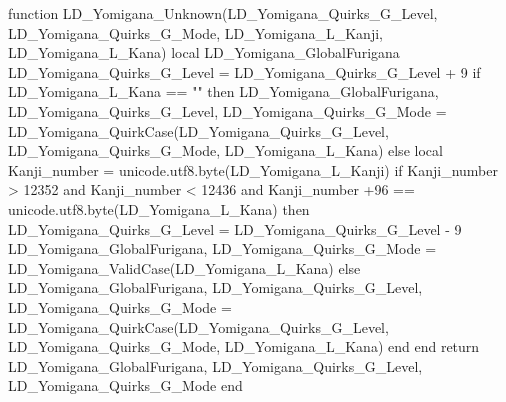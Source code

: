 {	function LD_Yomigana_Unknown(LD_Yomigana_Quirks_G_Level, LD_Yomigana_Quirks_G_Mode, LD_Yomigana_L_Kanji, LD_Yomigana_L_Kana)
		local LD_Yomigana_GlobalFurigana
		LD_Yomigana_Quirks_G_Level = LD_Yomigana_Quirks_G_Level + 9
		if LD_Yomigana_L_Kana == "" then
			LD_Yomigana_GlobalFurigana, LD_Yomigana_Quirks_G_Level, LD_Yomigana_Quirks_G_Mode = LD_Yomigana_QuirkCase(LD_Yomigana_Quirks_G_Level, LD_Yomigana_Quirks_G_Mode, LD_Yomigana_L_Kana) 		
		else
			local Kanji_number = unicode.utf8.byte(LD_Yomigana_L_Kanji)
			if Kanji_number > 12352 and Kanji_number < 12436 and Kanji_number +96 == unicode.utf8.byte(LD_Yomigana_L_Kana) then 
				LD_Yomigana_Quirks_G_Level = LD_Yomigana_Quirks_G_Level - 9
				LD_Yomigana_GlobalFurigana, LD_Yomigana_Quirks_G_Mode = LD_Yomigana_ValidCase(LD_Yomigana_L_Kana)
			else 
				LD_Yomigana_GlobalFurigana, LD_Yomigana_Quirks_G_Level, LD_Yomigana_Quirks_G_Mode = LD_Yomigana_QuirkCase(LD_Yomigana_Quirks_G_Level, LD_Yomigana_Quirks_G_Mode, LD_Yomigana_L_Kana) 
			end
		end	
		return LD_Yomigana_GlobalFurigana, LD_Yomigana_Quirks_G_Level, LD_Yomigana_Quirks_G_Mode
	end
	
}
